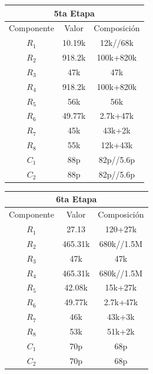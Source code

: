 \begin{table}[H]
\centering
\begin{tabular}{ccc}
\multicolumn{3}{c}{5ta Etapa}                                              \\ \hline
\multicolumn{1}{c|}{Componente} & \multicolumn{1}{c|}{Valor} & Composición \\ \hline
$R_1$                           & 10.19k                     & 12k//68k    \\
$R_2$                           & 918.2k                     & 100k+820k   \\
$R_3$                           & 47k                        & 47k         \\
$R_4$                           & 918.2k                     & 100k+820k   \\
$R_5$                           & 56k                        & 56k         \\
$R_6$                           & 49.77k                     & 2.7k+47k    \\
$R_7$                           & 45k                        & 43k+2k         \\
$R_8$                           & 55k                        & 12k+43k         \\
$C_1$                           & 88p                      & 82p//5.6p    \\
$C_2$                           & 88p                      & 82p//5.6p   
\end{tabular}
\end{table}

\begin{table}[H]
\centering
\begin{tabular}{ccc}
\multicolumn{3}{c}{6ta Etapa}                                              \\ \hline
\multicolumn{1}{c|}{Componente} & \multicolumn{1}{c|}{Valor} & Composición \\ \hline
$R_1$                           & 27.13                      & 120+27k     \\
$R_2$                           & 465.31k                    & 680k//1.5M  \\
$R_3$                           & 47k                        & 47k         \\
$R_4$                           & 465.31k                    & 680k//1.5M  \\
$R_5$                           & 42.08k                     & 15k+27k     \\
$R_6$                           & 49.77k                     & 2.7k+47k    \\
$R_7$                           & 46k                        & 43k+3k         \\
$R_8$                           & 53k                        & 51k+2k         \\
$C_1$                           & 70p                       & 68p        \\
$C_2$                           & 70p                       & 68p       
\end{tabular}
\end{table}
